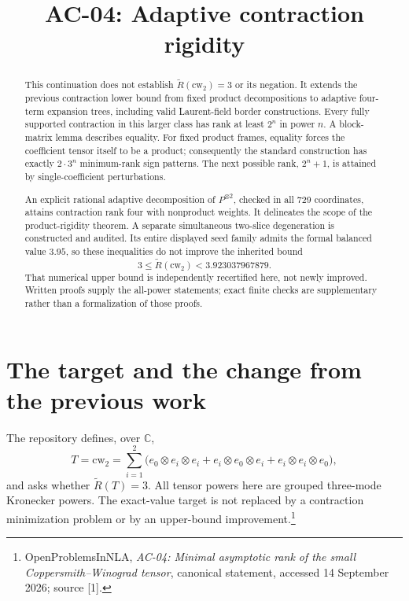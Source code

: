 \documentclass[11pt,letterpaper]{article}
\title{AC-04: Adaptive contraction rigidity}
\author{}\date{}
\theoremstyle{definition}\newtheorem{definition}[theorem]{Definition}
\theoremstyle{remark}\newtheorem{remark}[theorem]{Remark}
\newcommand{\AR}{\widetilde R}
\newcommand{\C}{\mathbb C}
\begin{document}
\maketitle
\vspace{-2.5em}
\begin{abstract}
This continuation does not establish $\AR(\mathrm{cw}_2)=3$ or its negation. It extends the previous contraction lower bound from fixed product decompositions to adaptive four-term expansion trees, including valid Laurent-field border constructions. Every fully supported contraction in this larger class has rank at least $2^n$ in power $n$. A block-matrix lemma describes equality. For fixed product frames, equality forces the coefficient tensor itself to be a product; consequently the standard construction has exactly $2\cdot3^n$ minimum-rank sign patterns. The next possible rank, $2^n+1$, is attained by single-coefficient perturbations.

An explicit rational adaptive decomposition of $P^{\otimes2}$, checked in all 729 coordinates, attains contraction rank four with nonproduct weights. It delineates the scope of the product-rigidity theorem. A separate simultaneous two-slice degeneration is constructed and audited. Its entire displayed seed family admits the formal balanced value $3.95$, so these inequalities do not improve the inherited bound
\[
3\leq\AR(\mathrm{cw}_2)<3.923037967879.
\]
That numerical upper bound is independently recertified here, not newly improved. Written proofs supply the all-power statements; exact finite checks are supplementary rather than a formalization of those proofs.
\end{abstract}

\section{The target and the change from the previous work}
The repository defines, over $\C$,
\begin{equation}\label{eq:T}
T=\mathrm{cw}_2=\sum_{i=1}^{2}\bigl(e_0\otimes e_i\otimes e_i+e_i\otimes e_0\otimes e_i+e_i\otimes e_i\otimes e_0\bigr),
\end{equation}
and asks whether $\AR(T)=3$. All tensor powers here are grouped three-mode Kronecker powers. The exact-value target is not replaced by a contraction minimization problem or by an upper-bound improvement.\footnote{OpenProblemsInNLA, \emph{AC-04: Minimal asymptotic rank of the small Coppersmith--Winograd tensor}, canonical statement, accessed 14 September 2026; source [1].}
\end{document}
